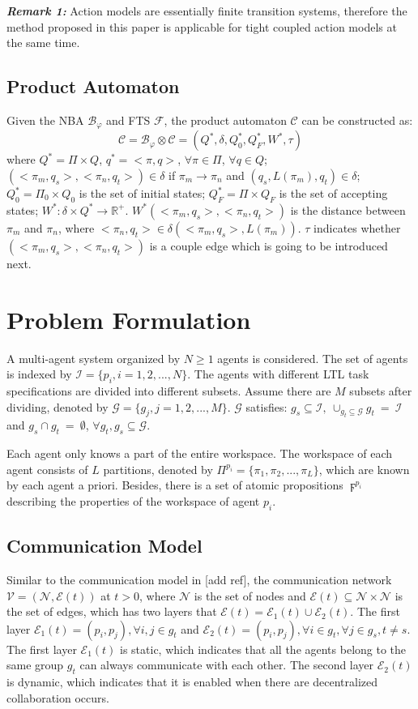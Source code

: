 \documentclass[journal]{IEEEtran}
\begin{document}
\textbf{\emph{Remark 1:}} Action models are essentially finite transition systems, therefore the method proposed in this paper is applicable for tight coupled action models at the same time.
\subsection{Product Automaton}
Given the NBA $\mathcal{B}_\varphi$ and FTS $\mathcal{F}$, the product automaton $\mathcal{C}$ can be constructed as:
$$\mathcal{C}=\mathcal{B}_\varphi\otimes \mathcal{C}=(Q^{\ast},\delta,Q^{\ast}_0,Q^{\ast}_F,W^{\ast},\tau)$$
where $Q^{\ast}=\Pi\times Q$, $q^{\ast}=<\pi,q>$, $\forall \pi \in \Pi$, $\forall q \in Q$; $(<\pi_m,q_s>,<\pi_n,q_t>)\in \delta$ if $\pi_m \rightarrow \pi_n$ and $(q_s,L(\pi_m),q_t)\in \delta$; $Q^{\ast}_0=\Pi_0\times Q_0$ is the set of initial states; $Q^{\ast}_F=\Pi\times Q_F$ is the set of accepting states; $W^{\ast}:\delta\times Q^{\ast}\rightarrow \mathbb{R}^{+}$. $W^{\ast}(<\pi_m,q_s>,<\pi_n,q_t>)$ is the distance between $\pi_m$ and $\pi_n$, where $<\pi_n,q_t>\in \delta(<\pi_m,q_s>,L(\pi_m))$. $\tau$ indicates whether $(<\pi_m,q_s>,<\pi_n,q_t>)$ is a couple edge which is going to be introduced next.
\section{Problem Formulation}
A multi-agent system organized by $N\geq1$ agents is considered. The set of agents is indexed by $\mathcal{I}=\{p_i,i=1,2,...,N\}$. The agents with different LTL task specifications are divided into different subsets. Assume there are $M$ subsets after dividing, denoted by $\mathcal{G}=\{g_j,j=1,2,...,M\}$. $\mathcal{G}$ satisfies: $g_s\subseteq \mathcal{I},\ \cup_{g_t\subseteq \mathcal{G}}g_t\ =\ \mathcal{I}$ and $g_s\cap g_t\ =\ \emptyset$, $\forall g_t,g_s \subseteq \mathcal{G}$.

Each agent only knows a part of the entire workspace. The workspace of each agent consists of $L$ partitions, denoted by $\Pi^{p_i}=\{\pi_1,\pi_2,...,\pi_L\}$, which are known by each agent a priori. Besides, there is a set of atomic propositions $\digamma^{p_i}$ describing the properties of the workspace of agent $p_i$.
\subsection{Communication Model}
Similar to the communication model in [add ref], the communication network $\mathcal{V}=(\mathcal{N},\mathcal{E}(t))$ at $t>0$, where $\mathcal{N}$ is the set of nodes and $\mathcal{E}(t)\subseteq \mathcal{N} \times \mathcal{N}$ is the set of edges, which has two layers that $\mathcal{E}(t)=\mathcal{E}_1(t)\cup \mathcal{E}_2(t)$. The first layer $\mathcal{E}_1(t)={(p_i,p_j),\forall i,j\in g_t}$ and $\mathcal{E}_2(t)={(p_i,p_j),\forall i\in g_t,\forall j \in g_s, t\neq s}$. The first layer $\mathcal{E}_1(t)$ is static, which indicates that all the agents belong to the same group $g_t$ can always communicate with each other. The second layer $\mathcal{E}_2(t)$ is dynamic, which indicates that it is enabled when there are decentralized collaboration occurs.
\end{document}
